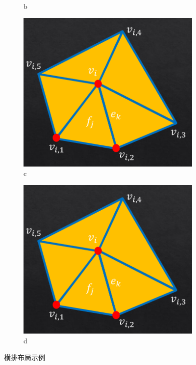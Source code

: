 \documentclass[12pt]{article} %
\begin{document}
\begin{figure}[!htb]
\begin{subfigure}[t]{0.24\linewidth}
\begin{minipage}[b]{1\linewidth}
      \caption{b}
      \end{minipage}
  \end{subfigure}
  \begin{subfigure}[t]{0.24\linewidth}
      \begin{minipage}[b]{1\linewidth}
      \includegraphics[width=1\linewidth]{mesh.png}
      \caption{c}
      \end{minipage}
  \end{subfigure}
  \begin{subfigure}[t]{0.24\linewidth}
      \begin{minipage}[b]{1\linewidth}
      \includegraphics[width=1\linewidth]{mesh.png}
      \caption{d}
      \end{minipage}
  \end{subfigure}
  \caption{横排布局示例}
  \label{F.csu_row}
\end{figure}
\end{document}

